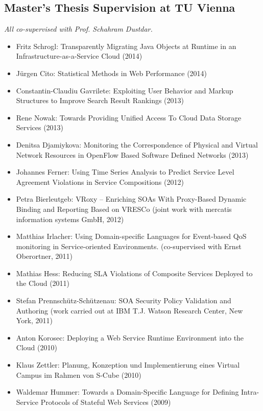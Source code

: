 \documentclass[paper=letter,fontsize=11pt]{scrartcl} %
\begin{document}
\subsection*{Master's Thesis Supervision at TU Vienna}

\emph{All co-supervised with Prof. Schahram Dustdar.}

\begin{itemize}
  \item Fritz Schrogl: Transparently Migrating Java Objects at Runtime in an Infrastructure-as-a-Service Cloud (2014)
  \item J\"urgen Cito: Statistical Methods in Web Performance (2014)
  \item Constantin-Claudiu Gavrilete: Exploiting User Behavior and Markup Structures to Improve Search Result Rankings (2013)
  \item Rene Nowak: Towards Providing Unified Access To Cloud Data Storage Services (2013)
  \item Denitsa Djamiykova: Monitoring the Correspondence of Physical and Virtual Network Resources in OpenFlow Based Software Defined Networks (2013)
  \item Johannes Ferner:  Using Time Series Analysis to Predict Service Level Agreement Violations in Service Compositions (2012)
\item Petra Bierleutgeb:  VRoxy -- Enriching SOAs With Proxy-Based Dynamic
  Binding and Reporting Based on VRESCo (joint work with mercatis information systems GmbH, 2012)
  \item Matthias Irlacher: Using Domain-specific Languages for Event-based QoS monitoring in Service-oriented Environments. (co-supervised with Ernst Oberortner, 2011)
  \item Mathias Hess:  Reducing SLA Violations of Composite Services Deployed to the Cloud (2011)
  \item Stefan Prennsch\"utz-Sch\"utzenau:  SOA Security Policy Validation and
  Authoring (work carried out at IBM T.J. Watson Research Center, New York, 2011)
    \item Anton Korosec:  Deploying a Web Service Runtime Environment into the
  Cloud (2010)
  \item Klaus Zettler:  Planung, Konzeption und Implementierung eines Virtual
  Campus im Rahmen von S-Cube (2010)
  \item Waldemar Hummer:  Towards a Domain-Specific Language for Defining
  Intra-Service Protocols of Stateful Web Services (2009)
\end{itemize}
\end{document}
